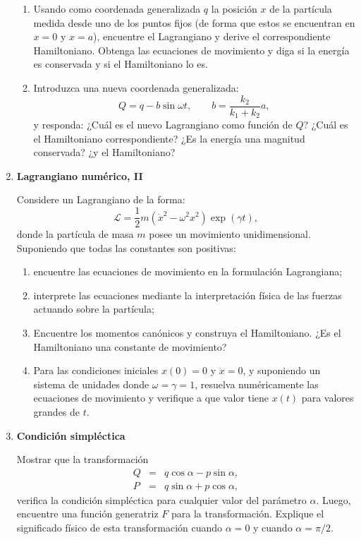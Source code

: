 \documentclass[a4paper,12pt]{article}
\begin{document}
\begin{enumerate}
    \begin{enumerate}
      \item Usando como coordenada generalizada $q$ la posición $x$ de la
        partícula medida desde uno de los puntos fijos (de forma que estos se
        encuentran en $x=0$ y $x=a$), encuentre el Lagrangiano y derive el
        correspondiente Hamiltoniano. Obtenga las ecuaciones de movimiento y
        diga si la energía es conservada y si el Hamiltoniano lo es.
      \item Introduzca una nueva coordenada generalizada: 
        \[ Q = q - b \sin \omega t, \quad \quad b=\frac{k_2}{k_1 + k_2} a,\]
        y responda: ¿Cuál es el nuevo Lagrangiano como función de $Q$? ¿Cuál es
        el Hamiltoniano correspondiente? ¿Es la energía una magnitud
        conservada? ¿y el Hamiltoniano?
    \end{enumerate}

  \item {\bf{Lagrangiano numérico, II}} 
    
    Considere un Lagrangiano de la forma: 
    \[ 
      \mathcal{L} = \frac12 m \left ( \dot x^2 - \omega^2 x^2  \right )
       \exp( \gamma t), 
    \] 
    donde la partícula de masa $m$ posee un movimiento unidimensional.
    Suponiendo que todas las constantes son positivas:
    
    \begin{enumerate}
      \item encuentre las ecuaciones de movimiento en la formulación
        Lagrangiana; 
      \item interprete las ecuaciones mediante la interpretación física de las
        fuerzas actuando sobre la partícula;
      \item Encuentre los momentos canónicos y construya el Hamiltoniano. ¿Es
        el Hamiltoniano una constante de movimiento? 
      \item Para las condiciones iniciales $x(0)=0$ y $\dot x=0$, y suponiendo
        un sistema de unidades donde $\omega=\gamma=1$, resuelva numéricamente
        las ecuaciones de movimiento y verifique a que valor tiene $x(t)$
        para valores grandes de $t$.
    \end{enumerate}

  \item {\bf{Condición simpléctica}}

    Mostrar que la transformación 
    \begin{eqnarray*}
      Q &=& q \cos \alpha - p \sin \alpha,\\
      P &=& q \sin \alpha + p \cos \alpha,
    \end{eqnarray*}
    verifica la condición simpléctica para cualquier valor del parámetro
    $\alpha$. Luego, encuentre una función generatriz $F$ para la
    transformación. Explique el significado físico de esta transformación
    cuando $\alpha=0$ y cuando $\alpha=\pi/2$.


\end{enumerate}
\end{document}
